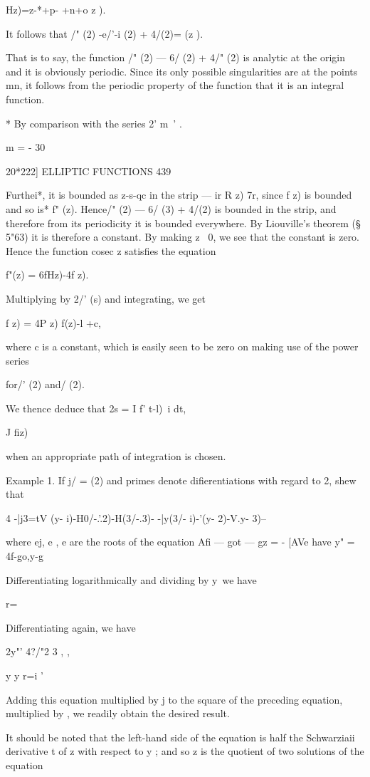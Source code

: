 { Hz)=z-*+p- +n+o z ).

It follows that /" (2) -e/'-i (2) + 4/(2)= (z ).

That is to say, the function /" (2) — 6/ (2) + 4/" (2) is analytic at
the origin and it is obviously periodic. Since its only possible
singularities are at the points mn, it follows from the periodic
property of the function that it is an integral function.

* By comparison with the series 2' m~' .

m = - 30

20*222] ELLIPTIC FUNCTIONS 439

Furthei*, it is bounded as z-s-qc in the strip — ir R z) 7r, since f
z) is bounded and so is* f" (z). Hence/" (2) — 6/ (3) + 4/(2) is
bounded in the strip, and therefore from its periodicity it is bounded
everywhere. By Liouville's theorem (§ 5"63) it is therefore a
constant. By making z ~0, we see that the constant is zero. Hence the
function cosec z satisfies the equation

f"(z) = 6fHz)-4f z).

Multiplying by 2/' (s) and integrating, we get

f z) = 4P z) f(z)-l +c,

where c is a constant, which is easily seen to be zero on making use
of the power series

for/' (2) and/ (2).

We thence deduce that 2s = I f' t-l)~i dt,

J fiz)

when an appropriate path of integration is chosen.

Example 1. If j/ = (2) and primes denote difierentiations with regard
to 2, shew that

4 -|j3=tV (y- i)-H0/-.'.2)-H(3/-.3)- -|y(3/- i)-'(y- 2)-V.y- 3)--\

where ej, e , e are the roots of the equation Afi — got — gz = - [AVe
have y" = 4f-go,y-g

Differentiating logarithmically and dividing by y\ we have

r=\

Differentiating again, we have

2y"' 4?/"2 3 , ,

y y r=i '

Adding this equation multiplied by j to the square of the preceding
equation, multiplied by , we readily obtain the desired result.

It should be noted that the left-hand side of the equation is half the
Schwarziaii derivative t of z with respect to y ; and so z is the
quotient of two solutions of the equation

}
